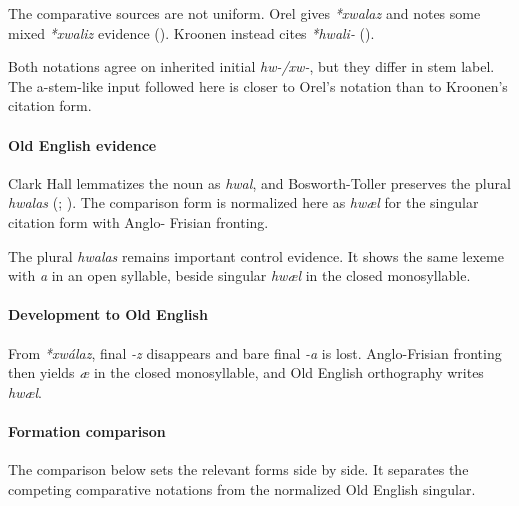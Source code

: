 \documentclass[
  british,
  a4paper,
]{article}
\begin{document}
The comparative sources are not uniform. Orel gives \emph{*xwalaz} and
notes some mixed \emph{*xwaliz} evidence (). Kroonen instead cites \emph{*hwali-}
().

Both notations agree on inherited initial \emph{hw-/xw-}, but they
differ in stem label. The a-stem-like input followed here is closer to
Orel's notation than to Kroonen's citation form.

\paragraph{Old English evidence}\label{old-english-evidence-34}

Clark Hall lemmatizes the noun as \emph{hwal}, and Bosworth-Toller
preserves the plural \emph{hwalas} (; ). The comparison form is normalized here as \emph{hwæl} for
the singular citation form with Anglo- Frisian fronting.

The plural \emph{hwalas} remains important control evidence. It shows
the same lexeme with \emph{a} in an open syllable, beside singular
\emph{hwæl} in the closed monosyllable.

\paragraph{Development to Old
English}\label{development-to-old-english-34}

From \emph{*xwálaz}, final \emph{-z} disappears and bare final \emph{-a}
is lost. Anglo-Frisian fronting then yields \emph{æ} in the closed
monosyllable, and Old English orthography writes \emph{hwæl}.

\paragraph{Formation comparison}\label{formation-comparison-7}

The comparison below sets the relevant forms side by side. It separates
the competing comparative notations from the normalized Old English
singular.
\end{document}
